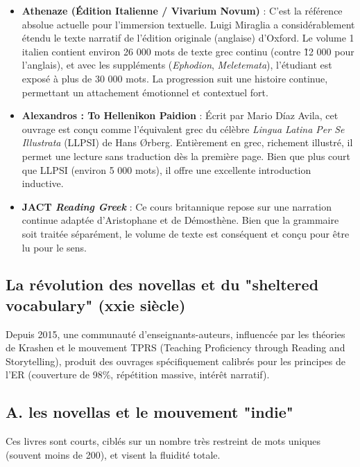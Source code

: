 \begin{itemize}\item \textbf{Athenaze (Édition Italienne / Vivarium Novum)} : C'est la référence absolue actuelle pour l'immersion textuelle. Luigi Miraglia a considérablement étendu le texte narratif de l'édition originale (anglaise) d'Oxford. Le volume 1 italien contient environ 26 000 mots de texte grec continu (contre \~12 000 pour l'anglais), et avec les suppléments (\textit{Ephodion}, \textit{Meletemata}), l'étudiant est exposé à plus de 30 000 mots.\cite{III-3-2-ref27} La progression suit une histoire continue, permettant un attachement émotionnel et contextuel fort.\item \textbf{Alexandros : To Hellenikon Paidion} : Écrit par Mario Díaz Avila, cet ouvrage est conçu comme l'équivalent grec du célèbre \textit{Lingua Latina Per Se Illustrata} (LLPSI) de Hans Ørberg. Entièrement en grec, richement illustré, il permet une lecture sans traduction dès la première page. Bien que plus court que LLPSI (environ 5 000 mots), il offre une excellente introduction inductive.\cite{III-3-2-ref27}\item \textbf{JACT \textit{Reading Greek}} : Ce cours britannique repose sur une narration continue adaptée d'Aristophane et de Démosthène. Bien que la grammaire soit traitée séparément, le volume de texte est conséquent et conçu pour être lu pour le sens.\cite{III-3-2-ref28}\end{itemize}

\subsection{La révolution des novellas et du "sheltered vocabulary" (xxie siècle)}

Depuis 2015, une communauté d'enseignants-auteurs, influencée par les théories de Krashen et le
mouvement TPRS (Teaching Proficiency through Reading and Storytelling), produit des ouvrages
spécifiquement calibrés pour les principes de l'ER (couverture de 98\%, répétition massive, intérêt
narratif).



\subsection{A. les novellas et le mouvement "indie"}

Ces livres sont courts, ciblés sur un nombre très restreint de mots uniques (souvent moins de 200),
et visent la fluidité totale.

